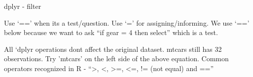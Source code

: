 \documentclass[ignorenonframetext,]{beamer}
\newenvironment{Shaded}{\begin{snugshade}}{\end{snugshade}}
\newcommand{\CommentTok}[1]{\textcolor[rgb]{0.56,0.35,0.01}{\textit{#1}}}
\newcommand{\DecValTok}[1]{\textcolor[rgb]{0.00,0.00,0.81}{#1}}
\newcommand{\KeywordTok}[1]{\textcolor[rgb]{0.13,0.29,0.53}{\textbf{#1}}}
\newcommand{\NormalTok}[1]{#1}
\newcommand{\OperatorTok}[1]{\textcolor[rgb]{0.81,0.36,0.00}{\textbf{#1}}}
\newcommand{\StringTok}[1]{\textcolor[rgb]{0.31,0.60,0.02}{#1}}
\begin{document}
\begin{frame}[fragile]{dplyr - filter}
\protect\hypertarget{dplyr---filter}{}

Use `==' when its a test/question. Use `=' for assigning/informing. We
use `==' below because we want to ask ``if gear = 4 then select'' which
is a test.

\begin{Shaded}
\end{Shaded}

All `dplyr operations dont affect the original dataset. mtcars still has
32 observations. Try 'mtcars' on the left side of the above equation.
Common operators recognized in R - ``\textgreater{}, \textless{},
\textgreater{}=, \textless{}=, != (not equal) and ==''

\end{frame}
\end{document}
